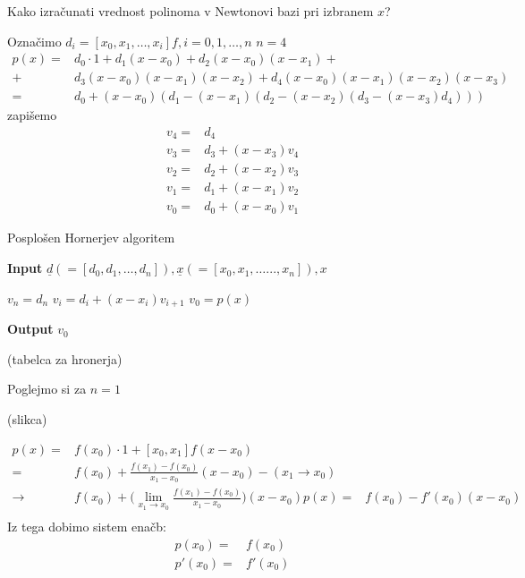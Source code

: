 \documentclass[a4paper,12pt]{article}
\theoremstyle{definition}
\theoremstyle{remark}
\begin{document}
Kako izračunati vrednost polinoma v Newtonovi bazi pri izbranem $x$?

Označimo $d_i = [x_0, x_1, \dots, x_i] f, i = 0, 1, \dots, n$
$n = 4$
\begin{align*}
    p(x) =& d_0 \cdot 1 + d_1 (x-x_0) + d_2 (x-x_0)(x-x_1) + \\
         +& d_3 (x-x_0)(x-x_1)(x-x_2) + d_4 (x-x_0)(x-x_1)(x-x_2)(x-x_3) \\
         =& d_0 + (x-x_0)(d_1 - (x-x_1)(d_2 - (x-x_2)(d_3 - (x-x_3)d_4)))
\end{align*}
zapišemo
\begin{align*}
    v_4 =& d_4 \\
    v_3 =& d_3 + (x-x_3)v_4 \\
    v_2 =& d_2 + (x-x_2)v_3 \\
    v_1 =& d_1 + (x-x_1)v_2 \\
    v_0 =& d_0 + (x-x_0)v_1
\end{align*}



\begin{algorithm}
    \caption{Posplošen Hornerjev algoritem}\label{alg:horner}
    \hspace*{\algorithmicindent} \textbf{Input} $\underline{d} (= [d_0, d_1, \dots, d_n]), \underline{x}(= [x_0, x_1, \dots..., x_n]), x$
    \begin{algorithmic}
        \State $v_n = d_n$
            \State $v_i = d_i + (x-x_i) v_{i+1}$
        \EndFor
        \State $v_0 = p(x)$
    \end{algorithmic}
    \hspace*{\algorithmicindent} \textbf{Output} $v_0$
\end{algorithm}

(tabelca za hronerja)

Poglejmo si za $n = 1$

(slikca)

\begin{align*}
    p(x) =& f(x_0)\cdot 1 + [x_0, x_1] f (x-x_0) \\
         =& f(x_0) + \frac{f(x_1) - f(x_0)}{x_1 - x_0}(x-x_0) - (x_1 \to x_0) \\
         \longrightarrow& f(x_0) + \biggl(\lim_{x_1 \to x_0} \frac{f(x_1)-f(x_0)}{x_1-x_0}\biggr)(x-x_0)
    p(x) =& f(x_0) - f'(x_0)(x-x_0) \\
\end{align*}
Iz tega dobimo sistem enačb:
\begin{align*}
    p(x_0) =& f(x_0) \\
    p'(x_0) =& f'(x_0)
\end{align*}
\end{document}
